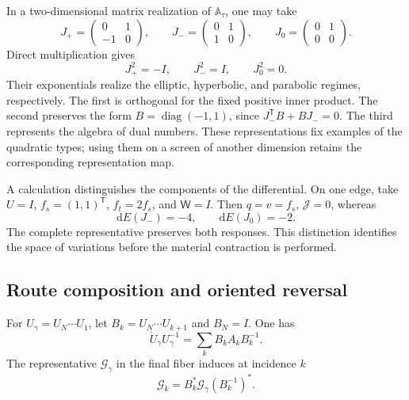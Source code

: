 In a two-dimensional matrix realization of
\(\mathbb A_\tau\), one may take
\[
 J_{+}=\begin{pmatrix}0&1\\-1&0\end{pmatrix},\qquad
 J_{-}=\begin{pmatrix}0&1\\1&0\end{pmatrix},\qquad
 J_{0}=\begin{pmatrix}0&1\\0&0\end{pmatrix}.
\]
Direct multiplication gives
\[
 J_+^2=-I,\qquad J_-^2=I,\qquad J_0^2=0.
\]
Their exponentials realize the elliptic, hyperbolic, and parabolic
regimes, respectively. The first is orthogonal for the fixed
positive inner product. The second preserves the form
\(B=\operatorname{diag}(-1,1)\), since
\(J_-^{\mathsf T}B+BJ_-=0\). The third represents the algebra
of dual numbers. These representations fix examples of the quadratic
types; using them on a screen of another dimension retains the
corresponding representation map.

A calculation distinguishes the components of the differential. On one edge,
take \(U=I\), \(f_s=(1,1)^{\mathsf T}\),
\(f_t=2f_s\), and \(\mathsf W=I\). Then \(q=v=f_s\),
\(\mathcal J=0\), whereas
\begin{equation}
 \mathrm dE(J_-)=-4,\qquad \mathrm dE(J_0)=-2.
 \label{vii:eq:control-regimenes-corriente}
\end{equation}
The complete representative preserves both responses. This distinction
identifies the space of variations before the material contraction
is performed.

\subsection{Route composition and oriented reversal}

\begin{proposition}
\label{vii:prop:pullback-invertible}
For \(U_\gamma=U_N\cdots U_1\), let
\(B_k=U_N\cdots U_{k+1}\) and \(B_N=I\). One has
\[
 \dot U_\gamma U_\gamma^{-1}
   =\sum_kB_kA_kB_k^{-1}.
\]
The representative \(\mathcal G_\gamma\) in the final fiber induces
at incidence \(k\)
\begin{equation}
 \mathcal G_k=B_k^*\mathcal G_\gamma(B_k^{-1})^*.
 \label{vii:eq:transporte-contragrediente}
\end{equation}
\end{proposition}

